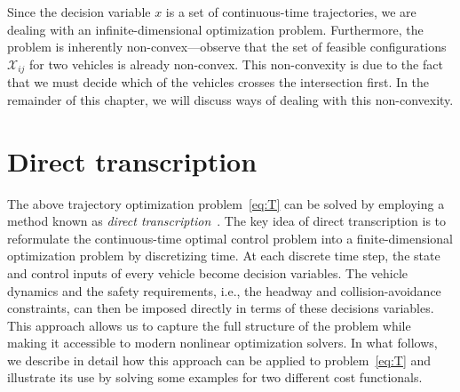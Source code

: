 \documentclass[a4paper]{report}
\theoremstyle{definition}
\theoremstyle{plain}
\begin{document}
Since the decision variable $x$ is a set of continuous-time trajectories, we are
dealing with an infinite-dimensional optimization problem. Furthermore, the
problem is inherently non-convex---observe that the set of feasible
configurations $\mathcal{X}_{ij}$ for two vehicles is already non-convex.
%
This non-convexity is due to the fact that we must decide which of the vehicles
crosses the intersection first. In the remainder of this chapter, we will
discuss ways of dealing with this non-convexity.


\section{Direct transcription}\label{sec:direct-transcription}

The above trajectory optimization problem~\eqref{eq:T} can be solved by
employing a method known as \emph{direct
  transcription}~\cite{kellyIntroductionTrajectoryOptimization2017,TrajectoryOptimization}.
%
The key idea of direct transcription is to reformulate the continuous-time
optimal control problem into a finite-dimensional optimization problem by
discretizing time.
%
At each discrete time step, the state and control inputs of every vehicle become
decision variables. The vehicle dynamics and the safety requirements, i.e., the
headway and collision-avoidance constraints, can then be imposed directly in
terms of these decisions variables.
%
This approach allows us to capture the full structure of the problem while
making it accessible to modern nonlinear optimization solvers.
%
In what follows, we describe in detail how this approach can be applied to
problem~\eqref{eq:T} and illustrate its use by solving some examples for two different
cost functionals.
\end{document}
